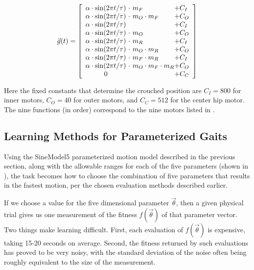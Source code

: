 \[
\vec{g}(t) =
\left[ {\begin{array}{c@{ }l@{ }l}
\amp \cdot \sin(2\pi t / \tau) & \ \cdot \           m_F            & + C_I \\ %
\amp \cdot \sin(2\pi t / \tau) & \ \cdot \ m_O \cdot m_F            & + C_O \\ %
\amp \cdot \sin(2\pi t / \tau) & \                                  & + C_I \\ %
\amp \cdot \sin(2\pi t / \tau) & \ \cdot \ m_O                      & + C_O \\ %
\amp \cdot \sin(2\pi t / \tau) & \ \cdot \                     m_R  & + C_I \\ %
\amp \cdot \sin(2\pi t / \tau) & \ \cdot \ m_O           \cdot m_R  & + C_O \\ %
\amp \cdot \sin(2\pi t / \tau) & \ \cdot \           m_F \cdot m_R  & + C_I \\ %
\amp \cdot \sin(2\pi t / \tau) & \ \cdot \ m_O \cdot m_F \cdot m_R  & + C_O \\ %
0                              & \                                  & + C_C \\ %
\end{array} } \right]
\]

\noindent Here the fixed constants that determine the crouched
position are $C_I = 800$ for inner motors, $C_O = 40$ for outer
motors, and $C_C = 512$ for the center hip motor.  The nine functions (in order)
correspond to the nine motors listed in
.



\subsection{Learning Methods for Parameterized Gaits}

Using the SineModel5 parameterized motion model described in the
previous section, along with the allowable ranges for each of the five
parameters (shown in ), the task becomes how to
choose the combination of five parameters that results in the fastest
motion, per the chosen evaluation methods described earlier.

If we choose a value for the five dimensional parameter
$\vec{\theta}$, then a given physical trial gives us one measurement
of the fitness $f(\vec{\theta})$ of that parameter vector.  Two
things make learning difficult.  First, each evaluation of
$f(\vec{\theta})$ is expensive, taking 15-20 seconds on
average.  Second, the fitness returned by such evaluations has proved
to be very noisy, with the standard deviation of the noise often being
roughly equivalent to the size of the measurement.

